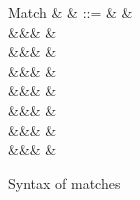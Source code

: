 \begin{figure}
\begin{syntaxfig}
\mbox{Match}
&
\xi
&
::=
&
&
\\
&&&
\matchUnit{\matchHole{}}
&
\\
&&&
\matchSum{\xi}{\sigma}
&
\\
&&&
\matchSumL{\xi}
&
\\
&&&
\matchSumR{\xi}
&
\\
&&&
\matchSum{\sigma}{\xi}
&
\\
&&&
&
\\
&&&
\matchRoll{\xi}
&
\end{syntaxfig}
\caption{Syntax of matches}
\end{figure}

